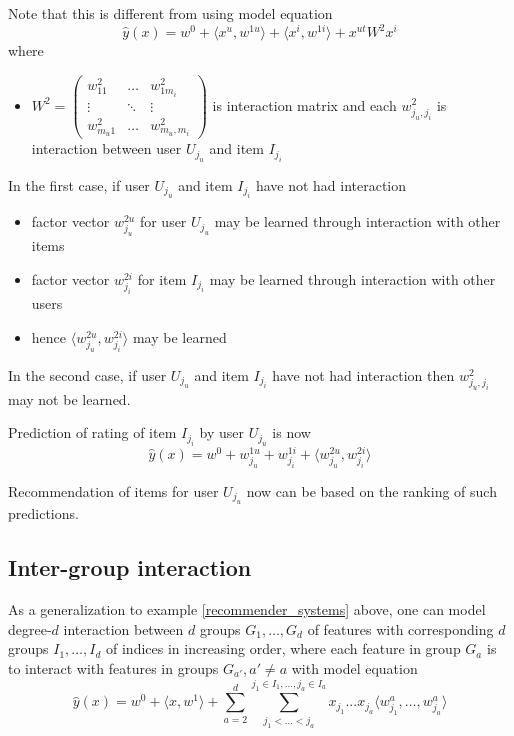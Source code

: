 \documentclass[14pt, reqno]{amsart}
\theoremstyle{definition}
\begin{document}
Note that this is different from using model equation
$$\hat{y}(x) = w^0 + \langle x^u, w^{1u} \rangle + \langle x^i, w^{1i} \rangle + x^{ut} W^2 x^i$$
where
\begin{itemize}
\item $W^2 = \left( \begin{array}{ccc} w_{11}^2 & \dots & w_{1m_i}^2 \\ \vdots & \ddots & \vdots \\ w_{m_u1}^2 & \dots & w_{m_u, m_i}^2 \end{array} \right)$
is interaction matrix and each $w_{j_u, j_i}^2$ is interaction between user $U_{j_u}$ and item $I_{j_i}$
\end{itemize}

In the first case, if user $U_{j_u}$ and item $I_{j_i}$ have not had interaction
\begin{itemize}
\item factor vector $w_{j_u}^{2u}$ for user $U_{j_u}$ may be learned through interaction with other items 
\item factor vector $w_{j_i}^{2i}$ for item $I_{j_i}$ may be learned through interaction with other users
\item hence $\langle w_{j_u}^{2u}, w_{j_i}^{2i} \rangle$ may be learned
\end{itemize}

In the second case, if user $U_{j_u}$ and item $I_{j_i}$ have not had interaction then $w_{j_u, j_i}^2$ may not be learned.

Prediction of rating of item $I_{j_i}$ by user $U_{j_u}$ is now
$$\hat{y}(x) = w^0 + w_{j_u}^{1u} + w_{j_i}^{1i} + \langle w_{j_u}^{2u}, w_{j_i}^{2i} \rangle$$

Recommendation of items for user $U_{j_u}$ now can be based on the ranking of such predictions.

\subsection{Inter-group interaction} As a generalization to example \ref{recommender_systems} above, one can model degree-$d$ interaction between $d$ groups $G_1, \dots , G_d$ of features with corresponding $d$ groups $I_1, \dots , I_d$ of indices in increasing order, where each feature in group $G_a$ is to interact with features in groups $G_{a'}, a' \neq a$ with model equation
$$\hat{y}(x) = w^0 + \langle x, w^1 \rangle + \sum\limits_{a = 2}^d \sum\limits_{j_1 < ... < j_a}^{j_1 \in I_1, \dots , j_a \in I_a} x_{j_1} ... x_{j_a} \langle w_{j_1}^a, \dots , w_{j_a}^a \rangle$$
\end{document}
